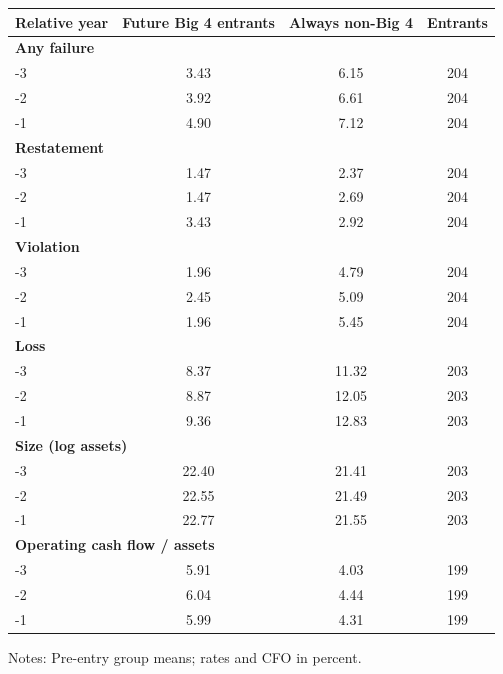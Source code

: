 \documentclass[10pt]{article}
\begin{document}
\begin{minipage}{19cm}\fontsize{10}{12}\selectfont\centering
\setlength{\tabcolsep}{4pt}\renewcommand{\arraystretch}{1.15}
\begin{tabular}{lccc}\toprule
Relative year & Future Big 4 entrants & Always non-Big 4 & Entrants \\ \midrule
\multicolumn{4}{l}{\textbf{Any failure}} \\
-3 & 3.43 & 6.15 & 204 \\
-2 & 3.92 & 6.61 & 204 \\
-1 & 4.90 & 7.12 & 204 \\
\multicolumn{4}{l}{\textbf{Restatement}} \\
-3 & 1.47 & 2.37 & 204 \\
-2 & 1.47 & 2.69 & 204 \\
-1 & 3.43 & 2.92 & 204 \\
\multicolumn{4}{l}{\textbf{Violation}} \\
-3 & 1.96 & 4.79 & 204 \\
-2 & 2.45 & 5.09 & 204 \\
-1 & 1.96 & 5.45 & 204 \\
\multicolumn{4}{l}{\textbf{Loss}} \\
-3 & 8.37 & 11.32 & 203 \\
-2 & 8.87 & 12.05 & 203 \\
-1 & 9.36 & 12.83 & 203 \\
\multicolumn{4}{l}{\textbf{Size (log assets)}} \\
-3 & 22.40 & 21.41 & 203 \\
-2 & 22.55 & 21.49 & 203 \\
-1 & 22.77 & 21.55 & 203 \\
\multicolumn{4}{l}{\textbf{Operating cash flow / assets}} \\
-3 & 5.91 & 4.03 & 199 \\
-2 & 6.04 & 4.44 & 199 \\
-1 & 5.99 & 4.31 & 199 \\
\bottomrule\end{tabular}\par\smallskip\raggedright\fontsize{9}{11}\selectfont Notes: Pre-entry group means; rates and CFO in percent.
\end{minipage}
\end{document}
